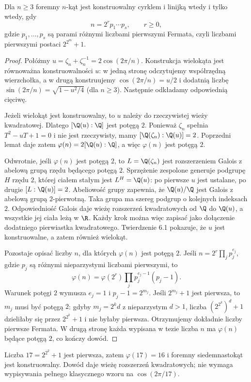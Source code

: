 \begin{twierdzenie}
Dla $n\ge3$ foremny $n$-kąt jest konstruowalny cyrklem i linijką wtedy i tylko wtedy, gdy
\[
n=2^r p_1\cdots p_s,\qquad r\ge0,
\]
gdzie $p_1,\ldots,p_s$ są parami różnymi liczbami pierwszymi Fermata, czyli liczbami pierwszymi postaci $2^{2^m}+1$.
\end{twierdzenie}
\begin{proof}
Połóżmy $u=\zeta_n+\zeta_n^{-1}=2\cos(2\pi/n)$. Konstrukcja wielokąta jest równoważna konstruowalności $u$: w jedną stronę odczytujemy współrzędną wierzchołka, a w drugą konstruujemy $\cos(2\pi/n)=u/2$ i dodatnią liczbę $\sin(2\pi/n)=\sqrt{1-u^2/4}$ (dla $n\ge3$). Następnie odkładamy odpowiednią cięciwę.

Jeżeli wielokąt jest konstruowalny, to $u$ należy do rzeczywistej wieży kwadratowej. Dlatego $[\Q(u):\Q]$ jest potęgą $2$. Ponieważ $\zeta_n$ spełnia $T^2-uT+1=0$ i nie jest rzeczywisty, mamy $[\Q(\zeta_n):\Q(u)]=2$. Poprzedni lemat daje zatem $\varphi(n)=2[\Q(u):\Q]$, a więc $\varphi(n)$ jest potęgą $2$.

Odwrotnie, jeśli $\varphi(n)$ jest potęgą $2$, to $L=\Q(\zeta_n)$ jest rozszerzeniem Galois z abelową grupą rzędu będącego potęgą $2$. Sprzężenie zespolone generuje podgrupę $H$ rzędu $2$, której ciałem stałym jest $L^H=\Q(u)$: po pierwsze $u$ jest ustalane, po drugie $[L:\Q(u)]=2$. Abeliowość grupy zapewnia, że $\Q(u)/\Q$ jest Galois z abelową grupą $2$-pierwotną. Taka grupa ma szereg podgrup o kolejnych indeksach $2$. Odpowiedniość Galois daje wieżę rozszerzeń kwadratowych od $\Q$ do $\Q(u)$, a wszystkie jej ciała leżą w $\R$. Każdy krok można więc zapisać jako dołączenie dodatniego pierwiastka kwadratowego. Twierdzenie 6.1 pokazuje, że $u$ jest konstruowalne, a zatem również wielokąt.

Pozostaje opisać liczby $n$, dla których $\varphi(n)$ jest potęgą $2$. Jeśli $n=2^r\prod_j p_j^{e_j}$, gdzie $p_j$ są różnymi nieparzystymi liczbami pierwszymi, to
\[
\varphi(n)=\varphi(2^r)\prod_j p_j^{e_j-1}(p_j-1).
\]
Warunek potęgi $2$ wymusza $e_j=1$ i $p_j-1=2^{m_j}$. Jeśli $2^{m_j}+1$ jest pierwsza, to $m_j$ musi być potęgą $2$: gdyby $m_j=2^k d$ z nieparzystym $d>1$, liczba $(2^{2^k})^d+1$ dzieliłaby się przez $2^{2^k}+1$ i nie byłaby pierwsza. Otrzymujemy dokładnie liczby pierwsze Fermata. W drugą stronę każda wypisana w tezie liczba $n$ ma $\varphi(n)$ będące potęgą $2$, co kończy dowód.
\end{proof}

\begin{przyklad}
Liczba $17=2^{2^2}+1$ jest pierwsza, zatem $\varphi(17)=16$ i foremny siedemnastokąt jest konstruowalny. Dowód daje wieżę rozszerzeń kwadratowych; nie wymaga wypisywania pełnego klasycznego wzoru na $\cos(2\pi/17)$.
\end{przyklad}


